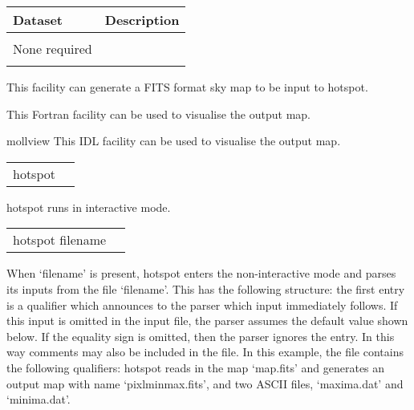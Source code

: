\begin{datasets}
{
\begin{tabular}{p{0.3\hsize} p{0.35\hsize}} \hline  
  \textbf{Dataset} & \textbf{Description} \\ \hline
                   &                      \\ %
  None required & \\ 
                   &                      \\ \hline %
\end{tabular}
} 
\end{datasets}

\begin{support}
  \begin{sulist}{} %
  \item[\htmlref{synfast}{fac:synfast}] This \healpix facility can generate a FITS format 
            sky map to be input to hotspot.
  \item[\htmlref{map2gif}{fac:map2gif}] This \healpix Fortran facility can be used to visualise the
  output map.
  \item[mollview] This \healpix IDL facility can be used to visualise the
  output map.
  \end{sulist}
\end{support}

\begin{examples}{1}
{
\begin{tabular}{ll} %
hotspot  \\
\end{tabular}
}
{
hotspot runs in interactive mode.
}
\end{examples}

\vfill\newpage

\begin{examples}{2}
{
\begin{tabular}{ll} %
hotspot  filename \\
\end{tabular}
}
{When `filename' is present, hotspot enters the non-interactive mode and parses
its inputs from the file `filename'. This has the following
structure: the first entry is a qualifier which announces to the parser
which input immediately follows. If this input is omitted in the
input file, the parser assumes the default value shown below.
If the equality sign is omitted, then the parser ignores the entry.
In this way comments may also be included in the file.
In this example, the file contains the following qualifiers:\hfill\newline
{}
hotspot reads in the map `map.fits' and generates
an output map with name `pixlminmax.fits', and two ASCII files,
`maxima.dat' and
`minima.dat'.
}
\end{examples}

